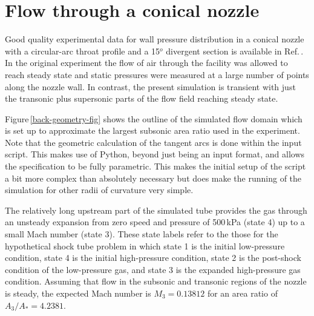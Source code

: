 
\newpage
\section{Flow through a conical nozzle}
\label{back-nozzle-sec}
%
Good quality experimental data for wall pressure distribution in a conical
nozzle with a circular-arc throat profile and a 15$^o$ divergent section
is available in Ref.\,\cite{back_etal_1965a}.
In the original experiment the flow of air through the facility 
was allowed to reach steady state and static pressures were measured 
at a large number of points along the nozzle wall.
In contrast, the present simulation is transient with just the transonic 
plus supersonic parts of the flow field reaching steady state.

Figure\,\ref{back-geometry-fig} shows the outline of the simulated flow
domain which is set up to approximate the largest subsonic area ratio
used in the experiment.
Note that the geometric calculation of the tangent arcs is done within the
input script.
This makes use of Python, beyond just being an input format, and allows the
specification to be fully parametric.
This makes the initial setup of the script a bit more complex than absolutely
necessary but does make the running of the simulation for other radii of curvature 
very simple.


The relatively long upstream part of the simulated tube provides the gas 
through an unsteady expansion from zero speed and pressure of 500\,kPa 
(state 4) up to a small Mach number (state 3).
These state labels refer to the those for 
the hypothetical shock tube problem in which 
state 1 is the initial low-pressure condition, 
state 4 is the initial high-pressure condition,
state 2 is the post-shock condition of the low-pressure gas,
and state 3 is the expanded high-pressure gas condition.
Assuming that flow in the subsonic and transonic regions of the nozzle is
steady, the expected Mach number is $M_3 = 0.13812$ for an area ratio of 
$A_3 / A_* = 4.2381$.

